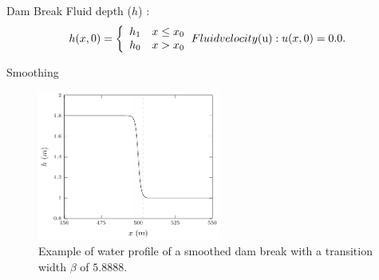 \documentclass[pdf]{beamer}
\begin{document}
\begin{frame}{Dam Break}
 Fluid depth ($h$) :
 \begin{subequations}
 	\begin{gather*}
 h(x,0) = \left\lbrace \begin{array}{c c}
 h_1  & x \le x_0\\ h_0  & x > x_0 
 \end{array} \right. 
 	\end{gather*}
 Fluid velocity  ($u$) :
 	\begin{gather*}
 	u(x,0) = 0.0 .
 	\end{gather*}
 \end{subequations} 
  
	
\end{frame}

\begin{frame}{Smoothing}

	
	\begin{figure}
		\includegraphics[width=6cm]{../Pics/Edit/ICbetaexample.pdf}
		\caption{Example of water profile of a smoothed dam break with a transition width $\beta$ of $5.8888$.}
	\end{figure}
	
\end{frame}
\end{document}
